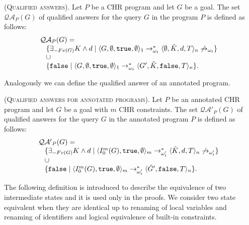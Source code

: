 \documentclass[final]{acmtrans2e}
\begin{document}
\begin{definition}\textsc{(Qualified answers)}. Let $P$ be a CHR program and let
$G$ be a goal. The set $\mathcal{QA}_P(G)$ of
qualified answers for the query $G$ in the program $P$ is defined
as follows:
$$
\hspace*{-0.2cm}\begin{array}{l}
\mathcal{QA}_P(G) =\\
\hspace{0.3cm} \{\exists_{-Fv(G)}K\wedge d \mid \langle
G,\emptyset,{\tt true}, \emptyset \rangle_1
\rightarrow^*_{\omega_t}
\langle \emptyset, \tilde K, d, T\rangle_n\not\rightarrow_{\omega_t}\}\\
\hspace{0.3cm}\cup\\
\hspace{0.3cm}\{{\tt false}\mid \langle G,\emptyset,{\tt true},
\emptyset \rangle_1 \rightarrow^*_{\omega_t} \langle G', \tilde K,
{\tt false}, T\rangle_n\}.
\end{array}
$$
\end{definition}

Analogously we can define the qualified answer of an annotated
program.

\begin{definition}\textsc{(Qualified answers for annotated programs)}.
Let $P$ be an annotated CHR program and let $G$ be a goal with $m$
CHR constraints. The set $\mathcal{QA'}_P(G)$ of qualified answers
for the query $G$ in the annotated program $P$ is defined as follows:
$$
\hspace*{-0.2cm}\begin{array}{l}
\mathcal{QA'}_P(G) = \\
\hspace*{0.3cm}\{\exists_{-Fv(G)}K\wedge d \mid \langle I_0^m (G),
{\tt true}, \emptyset\rangle_m\rightarrow^*_{\omega'_t}
\langle \tilde K, d, T\rangle_n\not\rightarrow_{\omega'_t}\}\\
\hspace{0.3cm}\cup\\
\hspace{0.3cm}\{{\tt false}\mid \langle I_0^m(G),
{\tt true},\emptyset\rangle_m\rightarrow^*_{\omega'_t}\langle
\tilde G', {\tt false}, T\rangle_n\}.
\end{array}
$$
\end{definition}

The following definition is introduced to describe the equivalence
of two intermediate states and it is used only in the proofs.
We consider two state equivalent when they are identical up to
renaming of local variables and renaming of identifiers and logical
equivalence of built-in constraints.
\end{document}

